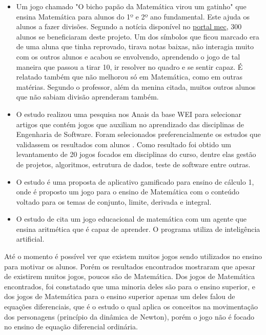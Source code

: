 \begin{itemize}
  \item Um jogo chamado "O bicho papão da Matemática virou um gatinho" que ensina Matemática para alunos do 1º e 2º ano fundamental. Este ajuda os alunos a fazer divisões. Segundo a notícia disponível no \href{http://portal.mec.gov.br/component/content/article?id=72701}{portal mec}, 300 alunos se beneficiaram deste projeto. Um dos símbolos que ficou marcado era de uma aluna que tinha reprovado, tirava notas baixas, não interagia muito com os outros alunos e acabou se envolvendo, aprendendo o jogo de tal maneira que passou a tirar 10, ir resolver no quadro e se sentir capaz. É relatado também que não melhorou só em Matemática, como em outras matérias. Segundo o professor, além da menina citada, muitos outros alunos que não sabiam divisão aprenderam também.


  \item O estudo \cite{sucessoJogoEngSoft} realizou uma pesquisa nos Anais da base WEI para selecionar artigos que contém jogos que auxiliam no aprendizado das disciplinas de Engenharia de Software. Foram selecionados preferencialmente os estudos que validassem os resultados com alunos \cite{sucessoJogoEngSoft}. Como resultado foi obtido um levantamento de 20 jogos focados em disciplinas do curso, dentre elas gestão de projetos, algoritmos, estrutura de dados, teste de software entre outras.

  \item O estudo \cite{appcalculo} é uma proposta de aplicativo gamificado para ensino de cálculo 1, onde é proposto um jogo para o ensino de Matemática com o conteúdo voltado para os temas de conjunto, limite, derivada e integral.

  \item O estudo de \cite{jogoSuporteMat} cita um jogo educacional de matemática com um agente que ensina aritmética que é capaz de aprender. O programa utiliza de inteligência artificial.   
\end{itemize}

Até o momento é possível ver que existem muitos jogos sendo utilizados no ensino para motivar os alunos. Porém os resultados encontrados mostraram que apesar de existirem muitos jogos, poucos são de Matemática. Dos jogos de Matemática encontrados, foi constatado que uma minoria deles são para o ensino superior, e dos jogos de Matemática para o ensino superior apenas um deles falou de equações diferenciais, que é o estudo \cite{videoGameED} o qual aplica os conceitos na movimentação dos personagens (princípio da dinâmica de Newton), porém o jogo não é focado no ensino de equação diferencial ordinária.

